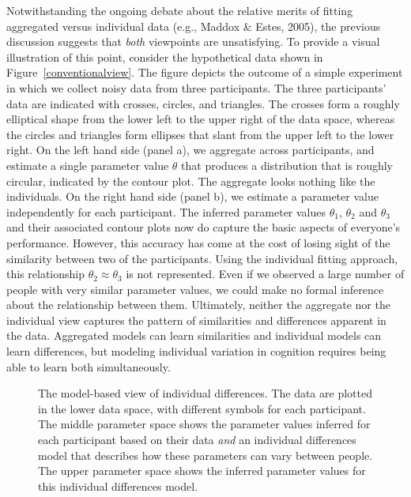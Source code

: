 \documentclass[authoryear]{elsarticle}
\newcommand{\bfc}{}
\newcommand{\efc}{\vspace*{15pt}}
\begin{document}
Notwithstanding the ongoing debate about the  relative merits of fitting
aggregated versus individual data (e.g., Maddox \& Estes, 2005),
the previous discussion suggests that \emph{both} viewpoints are unsatisfying.
To provide a visual illustration of this point, consider the hypothetical data
shown in Figure~\ref{conventionalview}.
The figure depicts the outcome of  a simple experiment in which we collect
noisy data from three participants. The three participants' data are indicated with crosses,
 circles, and triangles. The crosses form a roughly elliptical
shape from the lower left to the upper right of the data space, whereas the circles
and triangles form ellipses that slant from the upper left to the lower right. On the
left hand side (panel a), we aggregate across participants, and estimate a single
parameter value $\theta$ that produces a distribution that is roughly circular,
indicated by the contour plot. The aggregate looks nothing like the individuals. On the right hand side (panel b),
we estimate a parameter value independently for each participant. The  inferred parameter values $\theta_1$, $\theta_2$ and $\theta_3$ and their associated contour plots now do capture the basic aspects of everyone's performance. However, this accuracy has come at the cost of losing sight of the similarity between two of the
participants. Using the individual
fitting approach, this relationship $\theta_2 \approx \theta_3$ is not represented. Even if we observed a
large number of people with very similar parameter values, we could make no formal inference about the relationship between them. Ultimately, neither the aggregate nor the individual view captures the pattern of similarities and differences apparent in the data. Aggregated models can learn similarities and individual models
can learn differences, but modeling individual variation in cognition requires being able to learn both simultaneously.

\begin{figure}[t]
        \begin{center}
        \caption{\bfc The model-based view of individual differences. The data are plotted in the lower data space, with different symbols for each
        participant. The middle parameter space shows the parameter values inferred for each participant based on their data {\it and} an individual differences model that describes how these parameters can vary between people. The upper parameter space shows the inferred parameter values for this individual differences model. \efc}
        \label{modelview}
        \end{center}
\end{figure}
\end{document}
